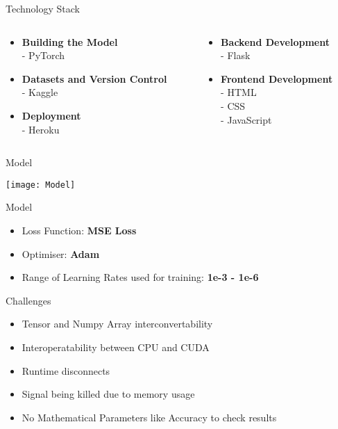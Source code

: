 \documentclass[12pt]{beamer}
\begin{document}
\begin{frame}{Technology Stack}
	\begin{columns}
		\begin{column}{0.5\textwidth}
			\begin{itemize}
				\item \textbf{Building the Model}\\
					- PyTorch\\
				\item \textbf{Datasets and Version Control}\\
					- Kaggle\\
				\item \textbf{Deployment}\\
					- Heroku\\
			\end{itemize}
		\end{column}
		\begin{column}{0.5\textwidth}
			\begin{itemize}
				\item \textbf{Backend Development}\\
					- Flask\\
				\item \textbf{Frontend Development}\\
					- HTML\\
					- CSS\\
					- JavaScript\\
			\end{itemize}
		\end{column}
	\end{columns}
\end{frame}

\begin{frame}{Model}
	\begin{center}
		\texttt{[image: Model]}
	\end{center}
\end{frame}

\begin{frame}{Model}
	\begin{itemize}
		\item Loss Function: \textbf{MSE Loss}
		\item Optimiser: \textbf{Adam}
		\item Range of Learning Rates used for training: \textbf{1e-3 - 1e-6}
	\end{itemize}
\end{frame}

\begin{frame}{Challenges}
	\begin{itemize}
		\item Tensor and Numpy Array interconvertability
		\item Interoperatability between CPU and CUDA
		\item Runtime disconnects
		\item Signal being killed due to memory usage
			\pause
		\item No Mathematical Parameters like Accuracy to check results
	\end{itemize}
\end{frame}
\end{document}
